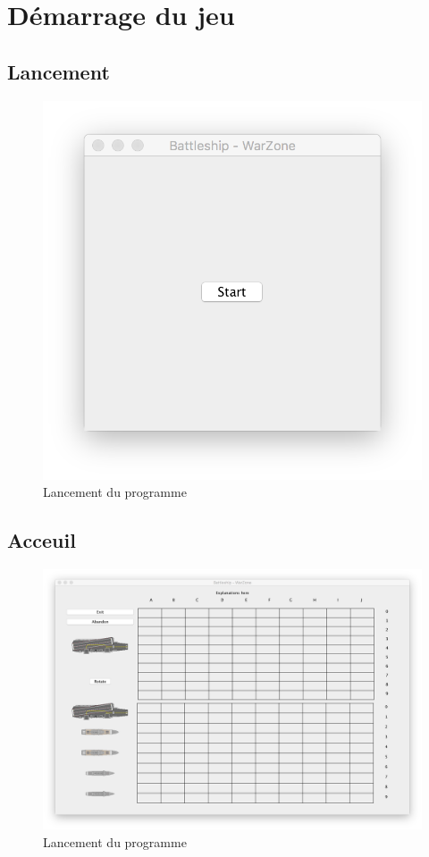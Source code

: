 \documentclass[a4paper,10pt]{article}
\begin{document}
\section{Démarrage du jeu}

\subsection{Lancement}

\begin{figure}[H]
    \center
    \includegraphics[scale=0.35]{images/start}
    \caption{Lancement du programme}
    \label{fig:my_label}
\end{figure}

\subsection{Acceuil}

\begin{figure}[H]
    \center
    \includegraphics[scale=0.35]{images/acceuil}
    \caption{Lancement du programme}
    \label{fig:my_label}
\end{figure}
\end{document}

